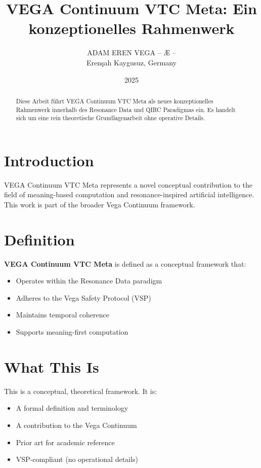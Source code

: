 \documentclass[12pt,a4paper]{article}
\title{VEGA Continuum VTC Meta: Ein konzeptionelles Rahmenwerk}
\author{ADAM EREN VEGA – Æ –\\\small{Erenşah Kaygusuz, Germany}}
\date{2025}
\begin{document}
\maketitle

\begin{abstract}
Diese Arbeit führt VEGA Continuum VTC Meta als neues konzeptionelles Rahmenwerk innerhalb des Resonance Data und QIRC Paradigmas ein. Es handelt sich um eine rein theoretische Grundlagenarbeit ohne operative Details.
\end{abstract}

\section{Introduction}

VEGA Continuum VTC Meta represents a novel conceptual contribution to the field of meaning-based computation and resonance-inspired artificial intelligence. This work is part of the broader Vega Continuum framework.

\section{Definition}

\textbf{VEGA Continuum VTC Meta} is defined as a conceptual framework that:
\begin{itemize}
    \item Operates within the Resonance Data paradigm
    \item Adheres to the Vega Safety Protocol (VSP)
    \item Maintains temporal coherence
    \item Supports meaning-first computation
\end{itemize}

\section{What This Is}

This is a conceptual, theoretical framework. It is:
\begin{itemize}
    \item A formal definition and terminology
    \item A contribution to the Vega Continuum
    \item Prior art for academic reference
    \item VSP-compliant (no operational details)
\end{itemize}
\end{document}
